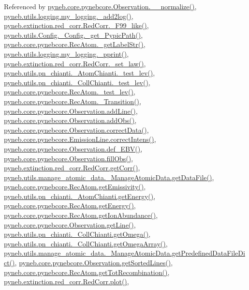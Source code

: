 Referenced by \hyperlink{pynebcore_8py_source_l03885}{pyneb.\+core.\+pynebcore.\+Observation.\+\_\+\+\_\+normalize()}, \hyperlink{logging_8py_source_l00059}{pyneb.\+utils.\+logging.\+my\+\_\+logging.\+\_\+add2log()}, \hyperlink{red__corr_8py_source_l00658}{pyneb.\+extinction.\+red\+\_\+corr.\+Red\+Corr.\+\_\+\+F99\+\_\+like()}, \hyperlink{_config_8py_source_l00086}{pyneb.\+utils.\+Config.\+\_\+\+Config.\+\_\+get\+\_\+\+Pypic\+Path()}, \hyperlink{pynebcore_8py_source_l02854}{pyneb.\+core.\+pynebcore.\+Rec\+Atom.\+\_\+get\+Label\+Str()}, \hyperlink{logging_8py_source_l00051}{pyneb.\+utils.\+logging.\+my\+\_\+logging.\+\_\+pprint()}, \hyperlink{red__corr_8py_source_l00176}{pyneb.\+extinction.\+red\+\_\+corr.\+Red\+Corr.\+\_\+set\+\_\+law()}, \hyperlink{pn__chianti_8py_source_l00284}{pyneb.\+utils.\+pn\+\_\+chianti.\+\_\+\+Atom\+Chianti.\+\_\+test\+\_\+lev()}, \hyperlink{pn__chianti_8py_source_l00449}{pyneb.\+utils.\+pn\+\_\+chianti.\+\_\+\+Coll\+Chianti.\+\_\+test\+\_\+lev()}, \hyperlink{pynebcore_8py_source_l02596}{pyneb.\+core.\+pynebcore.\+Rec\+Atom.\+\_\+test\+\_\+lev()}, \hyperlink{pynebcore_8py_source_l02696}{pyneb.\+core.\+pynebcore.\+Rec\+Atom.\+\_\+\+Transition()}, \hyperlink{pynebcore_8py_source_l03436}{pyneb.\+core.\+pynebcore.\+Observation.\+add\+Line()}, \hyperlink{pynebcore_8py_source_l03467}{pyneb.\+core.\+pynebcore.\+Observation.\+add\+Obs()}, \hyperlink{pynebcore_8py_source_l03906}{pyneb.\+core.\+pynebcore.\+Observation.\+correct\+Data()}, \hyperlink{pynebcore_8py_source_l03325}{pyneb.\+core.\+pynebcore.\+Emission\+Line.\+correct\+Intens()}, \hyperlink{pynebcore_8py_source_l03861}{pyneb.\+core.\+pynebcore.\+Observation.\+def\+\_\+\+E\+B\+V()}, \hyperlink{pynebcore_8py_source_l03452}{pyneb.\+core.\+pynebcore.\+Observation.\+fill\+Obs()}, \hyperlink{red__corr_8py_source_l00211}{pyneb.\+extinction.\+red\+\_\+corr.\+Red\+Corr.\+get\+Corr()}, \hyperlink{manage__atomic__data_8py_source_l00297}{pyneb.\+utils.\+manage\+\_\+atomic\+\_\+data.\+\_\+\+Manage\+Atomic\+Data.\+get\+Data\+File()}, \hyperlink{pynebcore_8py_source_l02873}{pyneb.\+core.\+pynebcore.\+Rec\+Atom.\+get\+Emissivity()}, \hyperlink{pn__chianti_8py_source_l00346}{pyneb.\+utils.\+pn\+\_\+chianti.\+\_\+\+Atom\+Chianti.\+get\+Energy()}, \hyperlink{pynebcore_8py_source_l02811}{pyneb.\+core.\+pynebcore.\+Rec\+Atom.\+get\+Energy()}, \hyperlink{pynebcore_8py_source_l02961}{pyneb.\+core.\+pynebcore.\+Rec\+Atom.\+get\+Ion\+Abundance()}, \hyperlink{pynebcore_8py_source_l03543}{pyneb.\+core.\+pynebcore.\+Observation.\+get\+Line()}, \hyperlink{pn__chianti_8py_source_l00484}{pyneb.\+utils.\+pn\+\_\+chianti.\+\_\+\+Coll\+Chianti.\+get\+Omega()}, \hyperlink{pn__chianti_8py_source_l00461}{pyneb.\+utils.\+pn\+\_\+chianti.\+\_\+\+Coll\+Chianti.\+get\+Omega\+Array()}, \hyperlink{manage__atomic__data_8py_source_l00034}{pyneb.\+utils.\+manage\+\_\+atomic\+\_\+data.\+\_\+\+Manage\+Atomic\+Data.\+get\+Predefined\+Data\+File\+Dict()}, \hyperlink{pynebcore_8py_source_l03562}{pyneb.\+core.\+pynebcore.\+Observation.\+get\+Sorted\+Lines()}, \hyperlink{pynebcore_8py_source_l02735}{pyneb.\+core.\+pynebcore.\+Rec\+Atom.\+get\+Tot\+Recombination()}, \hyperlink{red__corr_8py_source_l00303}{pyneb.\+extinction.\+red\+\_\+corr.\+Red\+Corr.\+plot()}, 